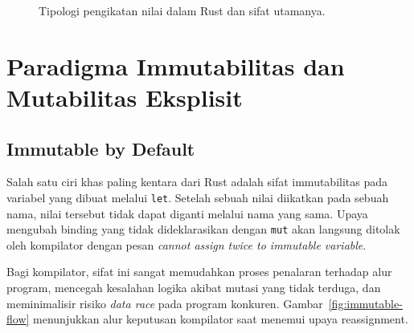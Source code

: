 \documentclass[11pt,a4paper]{article}
\begin{document}
\begin{figure}[H]
	\centering
	\caption{Tipologi pengikatan nilai dalam Rust dan sifat utamanya.}
	\label{fig:binding-tree}
\end{figure}

\section{Paradigma Immutabilitas dan Mutabilitas Eksplisit}

\subsection{Immutable by Default}

Salah satu ciri khas paling kentara dari Rust adalah sifat immutabilitas pada variabel yang dibuat melalui \texttt{let}. Setelah sebuah nilai diikatkan pada sebuah nama, nilai tersebut tidak dapat diganti melalui nama yang sama. Upaya mengubah binding yang tidak dideklarasikan dengan \texttt{mut} akan langsung ditolak oleh kompilator dengan pesan \textit{cannot assign twice to immutable variable}.

Bagi kompilator, sifat ini sangat memudahkan proses penalaran terhadap alur program, mencegah kesalahan logika akibat mutasi yang tidak terduga, dan meminimalisir risiko \textit{data race} pada program konkuren. Gambar~\ref{fig:immutable-flow} menunjukkan alur keputusan kompilator saat menemui upaya reassignment.
\end{document}
